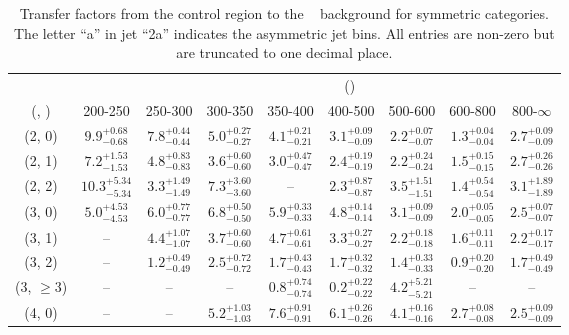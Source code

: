\begin{table}[h!]
\tiny
\centering
\caption{Transfer factors from the \mmj control region to the \zInv~ background for symmetric categories. The letter ``a'' in jet \eg ``2a''  indicates the asymmetric jet bins. All entries are non-zero but are truncated to one decimal place.\label{tab:tf_mumu_zinv_sym}}
\begin{tabular}
{ccccccccc}
	\hline\hline
&	& \multicolumn{8}{c}{\scalht (\gev)} \\ 
	 (\njet,  \nb) & 200-250 & 250-300 & 300-350 & 350-400 & 400-500 & 500-600 & 600-800 & 800-$\infty$ \\ [0.8ex] 
\hline
	(2, 0) & $9.9^{+ 0.68 }_{- 0.68 }$ & $7.8^{+ 0.44 }_{- 0.44 }$ & $5.0^{+ 0.27 }_{- 0.27 }$ & $4.1^{+ 0.21 }_{- 0.21 }$ & $3.1^{+ 0.09 }_{- 0.09 }$ & $2.2^{+ 0.07 }_{- 0.07 }$ & $1.3^{+ 0.04 }_{- 0.04 }$ & $2.7^{+ 0.09 }_{- 0.09 }$ \\[0.5ex] 
	(2, 1) & $7.2^{+ 1.53 }_{- 1.53 }$ & $4.8^{+ 0.83 }_{- 0.83 }$ & $3.6^{+ 0.60 }_{- 0.60 }$ & $3.0^{+ 0.47 }_{- 0.47 }$ & $2.4^{+ 0.19 }_{- 0.19 }$ & $2.2^{+ 0.24 }_{- 0.24 }$ & $1.5^{+ 0.15 }_{- 0.15 }$ & $2.7^{+ 0.26 }_{- 0.26 }$ \\[0.5ex] 
	(2, 2) & $10.3^{+ 5.34 }_{- 5.34 }$ & $3.3^{+ 1.49 }_{- 1.49 }$ & $7.3^{+ 3.60 }_{- 3.60 }$ & -- & $2.3^{+ 0.87 }_{- 0.87 }$ & $3.5^{+ 1.51 }_{- 1.51 }$ & $1.4^{+ 0.54 }_{- 0.54 }$ & $3.1^{+ 1.89 }_{- 1.89 }$ \\[0.5ex] 
	(3, 0) & $5.0^{+ 4.53 }_{- 4.53 }$ & $6.0^{+ 0.77 }_{- 0.77 }$ & $6.8^{+ 0.50 }_{- 0.50 }$ & $5.9^{+ 0.33 }_{- 0.33 }$ & $4.8^{+ 0.14 }_{- 0.14 }$ & $3.1^{+ 0.09 }_{- 0.09 }$ & $2.0^{+ 0.05 }_{- 0.05 }$ & $2.5^{+ 0.07 }_{- 0.07 }$ \\[0.5ex] 
	(3, 1) & -- & $4.4^{+ 1.07 }_{- 1.07 }$ & $3.7^{+ 0.60 }_{- 0.60 }$ & $4.7^{+ 0.61 }_{- 0.61 }$ & $3.3^{+ 0.27 }_{- 0.27 }$ & $2.2^{+ 0.18 }_{- 0.18 }$ & $1.6^{+ 0.11 }_{- 0.11 }$ & $2.2^{+ 0.17 }_{- 0.17 }$ \\[0.5ex] 
	(3, 2) & -- & $1.2^{+ 0.49 }_{- 0.49 }$ & $2.5^{+ 0.72 }_{- 0.72 }$ & $1.7^{+ 0.43 }_{- 0.43 }$ & $1.7^{+ 0.32 }_{- 0.32 }$ & $1.4^{+ 0.33 }_{- 0.33 }$ & $0.9^{+ 0.20 }_{- 0.20 }$ & $1.7^{+ 0.49 }_{- 0.49 }$ \\[0.5ex] 
	(3, $\ge3$) & -- & -- & -- & $0.8^{+ 0.74 }_{- 0.74 }$ & $0.2^{+ 0.22 }_{- 0.22 }$ & $4.2^{+ 5.21 }_{- 5.21 }$ & -- & -- \\[0.5ex] 
	(4, 0) & -- & -- & $5.2^{+ 1.03 }_{- 1.03 }$ & $7.6^{+ 0.91 }_{- 0.91 }$ & $6.1^{+ 0.26 }_{- 0.26 }$ & $4.1^{+ 0.16 }_{- 0.16 }$ & $2.7^{+ 0.08 }_{- 0.08 }$ & $2.5^{+ 0.09 }_{- 0.09 }$ \\[0.5ex] 

\end{tabular}
\end{table}
